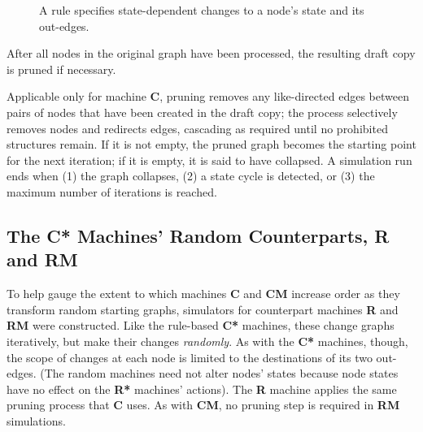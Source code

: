 \documentclass[twoside,twocolumn]{article}
\begin{document}
\begin{figure}[tb] 
    \centering
    \caption{A rule specifies state-dependent changes to a node's state and its out-edges.}
    \label{fig:Fig1}
\end{figure}

After all nodes in the original graph have been processed,
the resulting draft copy is pruned if necessary.

Applicable only for machine \textbf{C}, pruning removes
any like-directed edges between pairs of nodes that have been created in the
draft copy; the process selectively removes nodes
and redirects edges, cascading as required until no prohibited structures remain.
If it is not empty, the pruned graph becomes the starting point for the next iteration;
if it is empty, it is said to have collapsed.
A simulation run ends when (1) the graph collapses, (2) a state cycle is detected,
or (3) the maximum number of iterations is reached.

\subsection{The \textbf{C*} Machines' Random Counterparts, \textbf{R} and \textbf{RM}}

To help gauge the extent to which machines \textbf{C} and \textbf{CM}
increase order as they transform random starting graphs, simulators for counterpart
machines \textbf{R} and \textbf{RM} were constructed. Like the rule-based \textbf{C*} machines,
these change graphs iteratively, but make their changes \textit{randomly}.
As with the \textbf{C*} machines, though, the scope of changes at each node is
limited to the destinations of its two out-edges. (The random machines need not alter nodes' states
because node states have no effect on the \textbf{R*} machines' actions).
The \textbf{R} machine applies the same pruning process that \textbf{C} uses. As
with \textbf{CM}, no pruning step is required in \textbf{RM} simulations.
\end{document}
